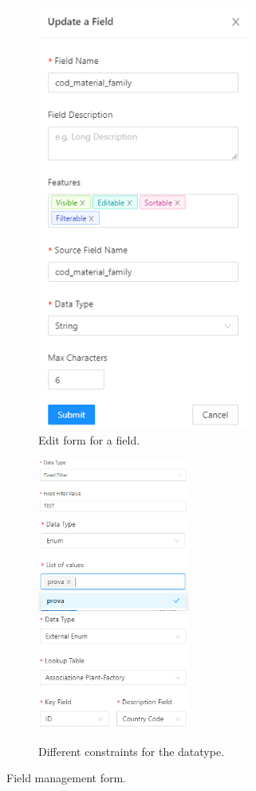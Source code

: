 \begin{figure}[!htb]

  \begin{subfigure}{\linewidth}
    \centering
    \includegraphics[width=7cm]{chapters/images/ch_3/FE/Admin/editField.png}
    \caption{Edit form for a field.}
    \label{fig:editFie}
  \end{subfigure}
  \begin{subfigure}{\linewidth}
    \centering
    \includegraphics[width=5cm]{chapters/images/ch_3/FE/Admin/fixed_filter.png}
    \includegraphics[width=5cm]{chapters/images/ch_3/FE/Admin/enum.png}
    \includegraphics[width=5cm]{chapters/images/ch_3/FE/Admin/external_enum.png}
    \caption{Different constraints for the datatype.}
    \label{fig:types}
  \end{subfigure}
  \caption{Field management form.}
  \label{editFields}
\end{figure}


